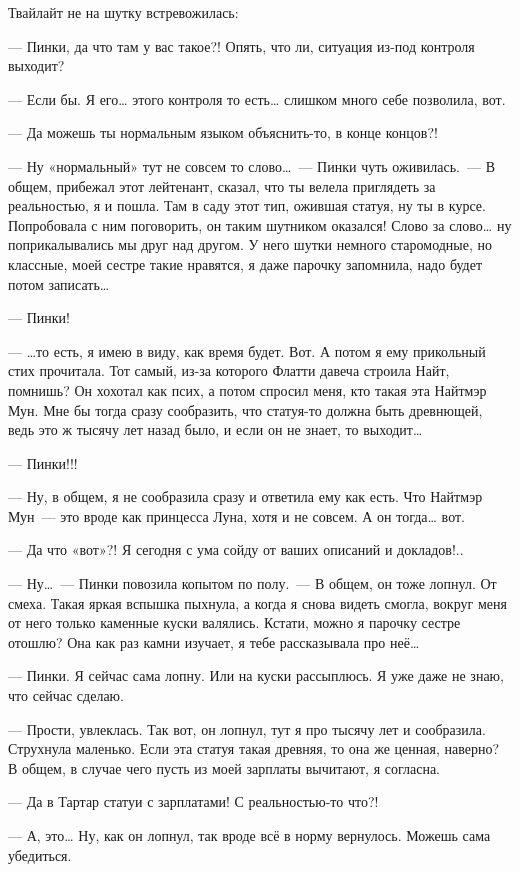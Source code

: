 \documentclass[twoside,a5paper,12pt]{extbook}
\begin{document}
Твайлайт не на шутку встревожилась:

— Пинки, да что там у вас такое?! Опять, что ли, ситуация из-под контроля выходит?

— Если бы. Я его… этого контроля то есть… слишком много себе позволила, вот.

— Да можешь ты нормальным языком объяснить-то, в конце концов?!

— Ну «нормальный» тут не совсем то слово… — Пинки чуть оживилась. — В общем, прибежал этот лейтенант, сказал, что ты велела приглядеть за реальностью, я и пошла. Там в саду этот тип, ожившая статуя, ну ты в курсе. Попробовала с ним поговорить, он таким шутником оказался! Слово за слово… ну поприкалывались мы друг над другом. У него шутки немного старомодные, но классные, моей сестре такие нравятся, я даже парочку запомнила, надо будет потом записать…

— Пинки!

— …то есть, я имею в виду, как время будет. Вот. А потом я ему прикольный стих прочитала. Тот самый, из-за которого Флатти давеча строила Найт, помнишь? Он хохотал как псих, а потом спросил меня, кто такая эта Найтмэр Мун. Мне бы тогда сразу сообразить, что статуя-то должна быть древнющей, ведь это ж тысячу лет назад было, и если он не знает, то выходит…

— Пинки!!!

— Ну, в общем, я не сообразила сразу и ответила ему как есть. Что Найтмэр Мун — это вроде как принцесса Луна, хотя и не совсем. А он тогда… вот.

— Да что «вот»?! Я сегодня с ума сойду от ваших описаний и докладов!..

— Ну… — Пинки повозила копытом по полу. — В общем, он тоже лопнул. От смеха. Такая яркая вспышка пыхнула, а когда я снова видеть смогла, вокруг меня от него только каменные куски валялись. Кстати, можно я парочку сестре отошлю? Она как раз камни изучает, я тебе рассказывала про неё…

— Пинки. Я сейчас сама лопну. Или на куски рассыплюсь. Я уже даже не знаю, что сейчас сделаю.

— Прости, увлеклась. Так вот, он лопнул, тут я про тысячу лет и сообразила. Струхнула маленько. Если эта статуя такая древняя, то она же ценная, наверно? В общем, в случае чего пусть из моей зарплаты вычитают, я согласна.

— Да в Тартар статуи с зарплатами! С реальностью-то что?!

— А, это… Ну, как он лопнул, так вроде всё в норму вернулось. Можешь сама убедиться.
\end{document}
